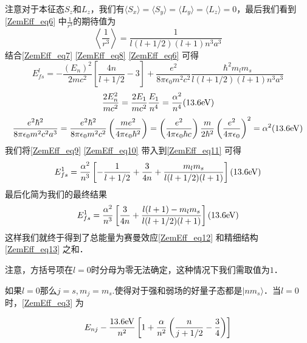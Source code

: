 注意对于本征态$S_z$和$L_z$，我们有$\langle S_x\rangle=\langle S_y\rangle=\langle L_y\rangle=\langle L_z\rangle=0$，最后我们看到\autoref{ZemEff_eq6} 中$\frac{1}{r^3}$的期待值为
\begin{equation}\label{ZemEff_eq11}
\left\langle\frac{1}{r^3}\right\rangle=\frac{1}{l(l+1/2)(l+1)n^3a^3}
\end{equation}
结合\autoref{ZemEff_eq7} \autoref{ZemEff_eq8} \autoref{ZemEff_eq6} 可得
\begin{equation}\label{ZemEff_eq9}
E_{fs}^l= -\frac{(E_n)^2}{2mc^2}\left[\frac{4n}{l+1/2}-3\right]+\frac{e^2}{8\pi\epsilon_0m^2c^2}\frac{\hbar^2
m_lm_s}{l(l+1/2)(l+1)n^3a^3}
\end{equation}
\begin{equation}\label{ZemEff_eq10}
\frac{2E_n^2}{mc^2}=\frac{2E_1}{mc^2}\frac{E_1}{n^4}=\frac{\alpha^2}{n^4}(13.6\rm{eV})
\end{equation}
\begin{equation}
\frac{e^2\hbar^2}{8\pi\epsilon_0m^2c^2a^3}=\frac{e^2\hbar^2}{8\pi\epsilon_0m^2c^2}\left(\frac{me^2}{4\pi\epsilon_0\hbar^2}\right)=\left(\frac{e^2}{4\pi\epsilon_0\hbar c}\right)\frac{m}{2\hbar^2}\left(\frac{e^2}{4\pi\epsilon_0}\right)^2=\alpha^2(13.6\rm{eV})
\end{equation}
我们将\autoref{ZemEff_eq9} \autoref{ZemEff_eq10} 带入到\autoref{ZemEff_eq11} 可得
\begin{equation}\label{ZemEff_eq13}
E_{fs}^1=\frac{\alpha^2}{n^3}\left[-\frac{1}{l+1/2}+\frac{3}{4n}+\frac{m_lm_s}{l(l+1/2)(l+1)}\right](13.6 \rm eV) 
\end{equation}
最后化简为我们的最终结果
\begin{equation}
E_{fs}^1=\frac{\alpha^2}{n^3}\left[\frac{3}{4n}+\frac{l(l+1)-m_lm_s}{l(l+1/2)(l+1)}\right](13.6 \rm eV)
\end{equation}
这样我们就终于得到了总能量为赛曼效应\autoref{ZemEff_eq12} 和精细结构 \autoref{ZemEff_eq13} 之和．

注意，方括号项在$l=0$时分母为零无法确定，这种情况下我们需取值为$1$．
\begin{example}{}
如果$l=0$那么$j=s,m_j=m_s$.使得对于强和弱场的好量子态都是$|nm_s\rangle$．当$l=0$时，\autoref{ZemEff_eq3} 为

\begin{equation}
E_{nj}-\frac{13.6\rm{eV}}{n^2}\left[1+\frac{\alpha}{n^2}\left(\frac{n}{j+1/2}-\frac{3}{4}\right)\right]
\end{equation}

\end{example}


